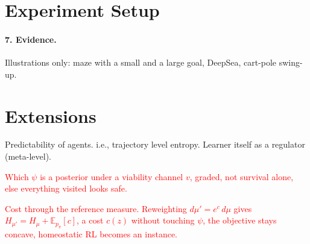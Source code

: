 \documentclass[10pt]{article}
\newcommand{\add}[1]{\textcolor{red}{#1}}
\begin{document}
\section{Experiment Setup}

\paragraph{7. Evidence.} Illustrations only: maze with a small and a large goal, DeepSea, cart-pole swing-up.

\section{Extensions}

Predictability of agents. i.e., trajectory level entropy. Learner itself as a regulator (meta-level). 

\add{Which $\psi$ is a posterior under a viability channel $v$, graded, not survival alone, else everything visited looks safe.} 


\add{Cost through the reference measure. Reweighting $d\mu' = e^{c}\,d\mu$ gives $H_{\mu'} = H_\mu + \mathbb E_{p_\pi}[c]$, a cost $c(z)$ without touching $\psi$, the objective stays concave, homeostatic RL becomes an instance.}


\end{document}
